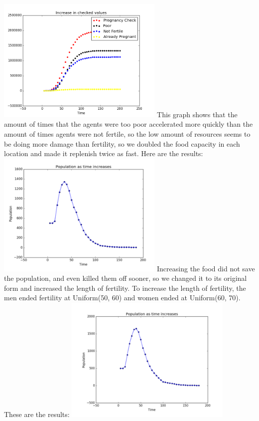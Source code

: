 \documentclass[11pt]{article}
\begin{document}
\begin{multicols}{2}
\includegraphics[width=80mm]{factors500.png} \newline
This graph shows that the amount of times that the agents were too poor accelerated more quickly than the amount of times agents were not fertile, so the low amount of resources seems to be doing more damage than fertility, so we doubled the food capacity in each location and made it replenish twice as fast. Here are the results: \newline
\includegraphics[width=80mm]{FoodCange.PNG} \newline
Increasing the food did not save the population, and even killed them off sooner, so we changed it to its original form and increased the length of fertility. To increase the length of fertility, the men ended fertility at Uniform(50, 60) and women ended at Uniform(60, 70). These are the results: \newline
\includegraphics[width=80mm]{FertChange.PNG} \newline

\end{multicols}
\end{document}
